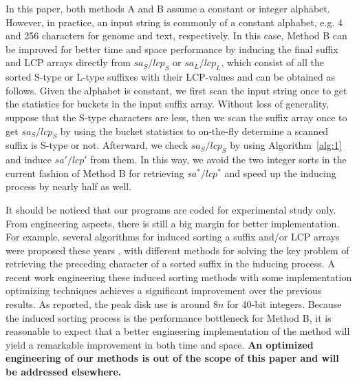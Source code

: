 \documentclass[10pt,journal,compsoc]{IEEEtran}
\begin{document}

In this paper, both methods A and B assume a constant or integer alphabet. However, in practice, an input string is commonly of a constant alphabet, e.g. 4 and 256 characters for genome and text, respectively. In this case, Method B can be improved for better time and space performance by inducing the final suffix and LCP arrays directly from $sa_S/lcp_S$ or $sa_L/lcp_L$, which consist of all the sorted S-type or L-type suffixes with their LCP-values and can be obtained as follows. Given the alphabet is constant, we first scan the input string once to get the statistics for buckets in the input suffix array. Without loss of generality, suppose that the S-type characters are less, then we scan the suffix array once to get $sa_S/lcp_S$ by using the bucket statistics to on-the-fly determine a scanned suffix is S-type or not. Afterward, we check $sa_S/lcp_S$ by using Algorithm~\ref{alg:1} and induce $sa'/lcp'$ from them. In this way, we avoid the two integer sorts in the current fashion of Method B for retrieving $sa^*/lcp^*$ and speed up the inducing process by nearly half as well.

It should be noticed that our programs are coded for experimental study only. From engineering aspects, there is still a big margin for better implementation. For example, several algorithms for induced sorting a suffix and/or LCP arrays were proposed these years \cite{Nong15,Nong14,Bingmann12}, with different methods for solving the key problem of retrieving the preceding character of a sorted suffix in the inducing process. A recent work \cite{Karkkainen2017} engineering these induced sorting methods with some implementation optimizing techniques achieves a significant improvement over the previous results. As reported, the peak disk use is around $8n$ for 40-bit integers. Because the induced sorting process is the performance bottleneck for Method B, it is reasonable to expect that a better engineering implementation of the method will yield a remarkable improvement in both time and space. {\bf An optimized engineering of our methods is out of the scope of this paper and will be addressed elsewhere.}
\end{document}
